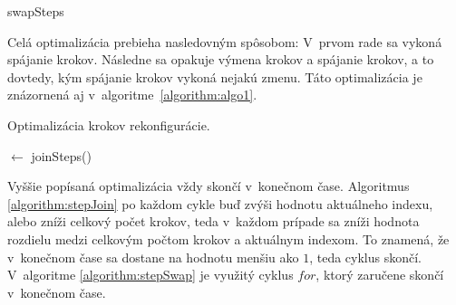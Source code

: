 \documentclass[
  printed, %
  oneside, %
  notable,   %
  nolof,     %
  nolot,     %
]{fithesis3}
\begin{document}
\begin{algorithm}
    \caption{swapSteps}
    \label{algorithm:stepSwap}
    
    \DontPrintSemicolon
    
\end{algorithm}

Celá optimalizácia prebieha nasledovným spôsobom: V~prvom rade sa vykoná spájanie krokov. Následne sa opakuje výmena krokov a spájanie krokov, a to dovtedy, kým spájanie krokov vykoná nejakú zmenu. Táto optimalizácia je znázornená aj v~algoritme~\ref{algorithm:algo1}. 

\begin{algorithm}
    \caption{Optimalizácia krokov rekonfigurácie. }
    \label{algorithm:algo1}
    
    \DontPrintSemicolon
    
    \Steps $\leftarrow$ joinSteps(\Steps)\;
\end{algorithm}

Vyššie popísaná optimalizácia vždy skončí v~konečnom čase. Algoritmus \ref{algorithm:stepJoin} po každom cykle buď zvýši hodnotu aktuálneho indexu, alebo zníži celkový počet krokov, teda v~každom prípade sa zníži hodnota rozdielu medzi celkovým počtom krokov a aktuálnym indexom. To znamená, že v~konečnom čase sa dostane na hodnotu menšiu ako $1$, teda cyklus skončí. V~algoritme \ref{algorithm:stepSwap} je využitý cyklus $for$, ktorý zaručene skončí v~konečnom čase. 
\end{document}
